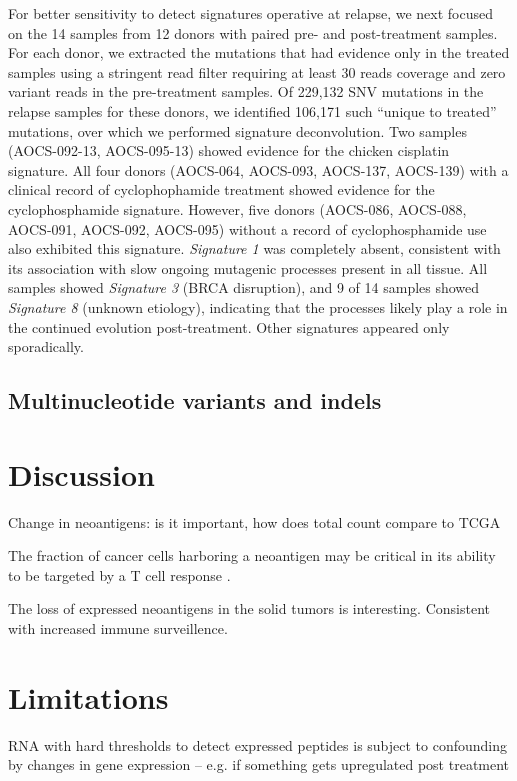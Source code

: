 For better sensitivity to detect signatures operative at relapse, we next focused on the 14 samples from 12 donors with paired pre- and post-treatment samples. For each donor, we extracted the mutations that had evidence only in the treated samples using a stringent read filter requiring at least 30 reads coverage and zero variant reads in the pre-treatment samples. Of 229,132 SNV mutations in the relapse samples for these donors, we identified 106,171 such ``unique to treated'' mutations, over which we performed signature deconvolution. Two samples (AOCS-092-13, AOCS-095-13) showed evidence for the chicken cisplatin signature. All four donors (AOCS-064, AOCS-093, AOCS-137, AOCS-139) with a clinical record of cyclophophamide treatment showed evidence for the cyclophosphamide signature. However, five donors (AOCS-086, AOCS-088, AOCS-091, AOCS-092, AOCS-095) without a  record of cyclophosphamide use also exhibited this signature. \textit{Signature 1} was completely absent, consistent with its association with slow ongoing mutagenic processes present in all tissue. All samples showed \textit{Signature 3} (BRCA disruption), and 9 of 14 samples showed \textit{Signature 8} (unknown etiology), indicating that the processes likely play a role in the continued evolution post-treatment. Other signatures appeared only sporadically.

\subsection*{Multinucleotide variants and indels}


\section*{Discussion}

Change in neoantigens: is it important, how does total count compare to TCGA

The fraction of cancer cells harboring a neoantigen may be critical in its ability to be targeted by a T cell response \cite{McGranahan_2016}.

The loss of expressed neoantigens in the solid tumors is interesting. Consistent with increased immune surveillence.



\section*{Limitations}
RNA with hard thresholds to detect expressed peptides is subject to confounding by changes in gene expression -- e.g. if something gets upregulated post treatment

